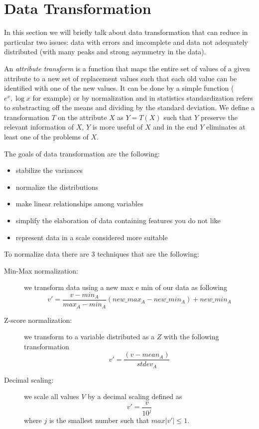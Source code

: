 \section{Data Transformation}
In this section we will briefly talk about data transformation that can reduce in particular two issues: data with errors and imcomplete and 
data not adequately distributed (with many peaks and strong asymmetry in the data).

An \emph{attribute transform} is a function that maps the entire set of values of a given attribute to a new set of replacement values such that
each old value can be identified with one of the new values.\newline
It can be done by a simple function ($e^x, \log x$ for example) or by normalization and in statistics standardization refers to substracting off
the means and dividing by the standard deviation.\newline
We define a transformation $T$ on the attribute $X$ as $Y = T(X)$ such that $Y$ preserve the relevant information of $X$, $Y$ is more useful of $X$ and 
in the end $Y$ eliminates at least one of the problems of $X$.

The goals of data transformation are the following:
\begin{itemize}
    \item stabilize the variances
    \item normalize the distributions
    \item make linear relationships among variables
    \item simplify the elaboration of data containing features you do not like
    \item represent data in a scale considered more suitable
\end{itemize}
To normalize data there are $3$ techniques that are the following:
\begin{description}
    \item [Min-Max normalization: ] we transform data using a new max e min of our data as following
	    			    \[ v' = \frac{v - min_A}{max_A - min_A} (new\_max_A - new\_min_A) + new\_min_A \]
    \item [Z-score normalization: ] we transform to a variable distributed as a $Z$ with the following transformation
	                            \[ v' = \frac{(v - mean_A)}{stdev_A} \]
    \item [Decimal scaling: ] we scale all values $V$ by a decimal scaling defined as
	                      \[ v' = \frac{v}{10^j} \]
			      where $j$ is the smallest number such that $max |v'| \leq 1$.
\end{description}


